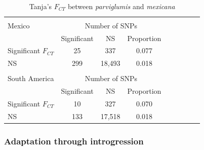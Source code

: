 {{\begin{table}[tb]
\begin{center}
 \caption[]{Tanja's $F_{CT}$ between \emph{parviglumis} and \emph{mexicana}\hspace*{0.3cm}}
  \textbf{}\\[-2mm]
{\fontsize{7}{11}\sf
    \begin{tabular}{lcccccccl} 
    \hline
       & & \\[-3mm]
Mexico     & \multicolumn{3}{c}{Number of SNPs}  \\
                                  & Significant & NS          & Proportion  \\
Significant $F_{CT}$ & 25              &   337       & 0.077\\ 
NS                             & 299            &  18,493   & 0.018\\
      \hline
    & & \\[-3mm]
South America     & \multicolumn{3}{c}{Number of SNPs} \\
                                     & Significant & NS           & Proportion  \\
Significant $F_{CT}$    & 10              &   327        & 0.070\\ 
NS                                & 133            &  17,518    & 0.018\\[1mm]
    \hline
    \end{tabular}
    \label{tanja}  %
}
\end{center}
\end{table}
\renewcommand{\arraystretch}{1}



\subsubsection{Adaptation through introgression}

}}
